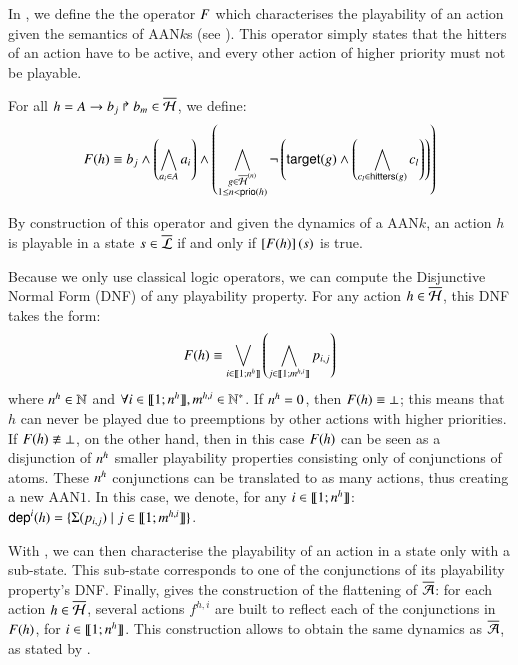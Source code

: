 In , we define the the operator $F$ which characterises the playability of an action
given the semantics of AAN$k$s (see ).
This operator simply states that the hitters of an action have to be active,
and every other action of higher priority must not be playable.

\begin{definition}\label{def:fop}
  For all $h = A\rightarrow b_j\Rsh b_m \in \overline{\mathcal{H}}$, we define:
  \[
    F(h) \equiv
    b_j \wedge
    \left(\bigwedge_{a_i \in A} a_i\right)
    \wedge
      \left( \bigwedge_{\substack{g \in \overline{\mathcal{H}}^{(n)}\\1 \leq n < \mathsf{prio}(h)}}
      \neg \left( \mathsf{target}(g) \wedge \left(\bigwedge_{c_l \in \mathsf{hitters}(g)} c_l\right)\right) \right)
  \]
\end{definition}
%
By construction of this operator and given the dynamics of a AAN$k$,
an action $h$ is playable in a state $s \in \overline{\mathcal{L}}$ if and only if
$\left[F(h)\right](s)$ is true.

Because we only use classical logic operators, we can compute the Disjunctive Normal Form (DNF) of any playability property.
For any action $h \in \overline{\mathcal{H}}$, this DNF takes the form:
\[F(h) \equiv \bigvee_{i \in \llbracket 1; n^{h} \rrbracket} \left( \bigwedge_{j \in \llbracket 1; m^{h,i} \rrbracket} p_{i,j} \right)\]
where $n^{h} \in \mathbb{N}$ and $\forall i \in \llbracket 1; n^{h} \rrbracket, m^{h,i} \in \mathbb{N}^*$.
If $n^{h} = 0$, then $F(h) \equiv \bot$; this means that $h$ can never be played
due to preemptions by other actions with higher priorities.
If $F(h) \not\equiv \bot$, on the other hand, then in this case $F(h)$
can be seen as a disjunction of $n^{h}$ smaller playability properties consisting only of conjunctions of atoms.
These $n^{h}$ conjunctions can be translated to as many actions,
thus creating a new AAN$1$.
In this case, we denote, for any $i \in \llbracket 1; n^{h} \rrbracket$:
$\mathsf{dep}^{i}(h) = \{ \Sigma(p_{i,j}) \mid j \in \llbracket 1; m^{h,i} \rrbracket \}$.

With , we can then characterise the playability of an action in a state only with a sub-state.
This sub-state corresponds to one of the conjunctions of its playability property's DNF.
Finally,  gives the construction of the flattening of $\overline{\mathcal{A}}$:
for each action $h \in \overline{\mathcal{H}}$, several actions $f^{h,i}$ are built to reflect each of the conjunctions in $F(h)$,
\ie for $i \in \llbracket 1; n^{h} \rrbracket$.
This construction allows to obtain the same dynamics as $\overline{\mathcal{A}}$, as stated by .

